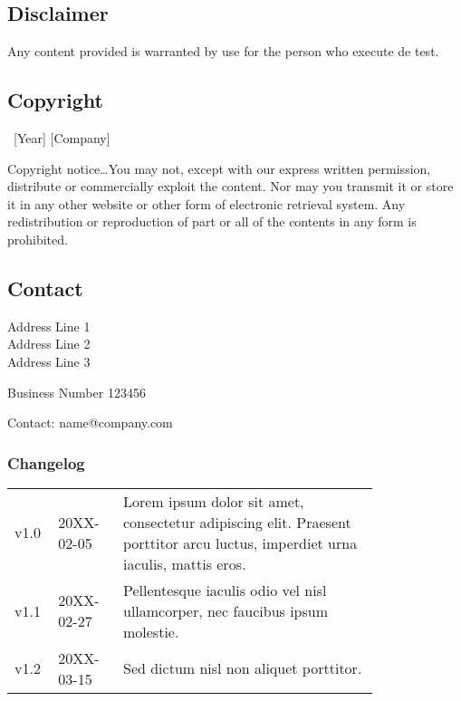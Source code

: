 \documentclass[
	a4paper, %
	12pt, %
]{CSSullivanBusinessReport}
\begin{document}
\begin{twothirdswidth} %
	\footnotesize %
	
	\subsection*{Disclaimer}

	Any content provided is warranted by use for the person who execute de test.
	
	\subsection*{Copyright}
	
	\textcopyright~[Year] [Company] 
	
	Copyright notice\ldots You may not, except with our express written permission, distribute or commercially exploit the content. Nor may you transmit it or store it in any other website or other form of electronic retrieval system. Any redistribution or reproduction of part or all of the contents in any form is 
	prohibited.
	
	\subsection*{Contact}
	
	Address Line 1\\
	Address Line 2\\
	Address Line 3
	
	Business Number 123456
	
	Contact: name@company.com
	
	\vfill %
	
	\subsubsection*{Changelog}
	
	\scriptsize %
	
	\begin{tabular}{@{} L{0.05\linewidth} L{0.15\linewidth} L{0.6\linewidth} @{}} %
		\toprule
		v1.0 & 20XX-02-05 & Lorem ipsum dolor sit amet, consectetur adipiscing elit. Praesent porttitor arcu luctus, imperdiet urna iaculis, mattis eros.\\
		v1.1 & 20XX-02-27 & Pellentesque iaculis odio vel nisl ullamcorper, nec faucibus ipsum molestie.\\
		v1.2 & 20XX-03-15 & Sed dictum nisl non aliquet porttitor.\\
		\bottomrule
	\end{tabular}
\end{twothirdswidth}
\end{document}
